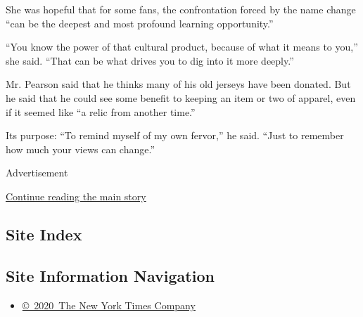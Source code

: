 She was hopeful that for some fans, the confrontation forced by the name
change ``can be the deepest and most profound learning opportunity.''

``You know the power of that cultural product, because of what it means
to you,'' she said. ``That can be what drives you to dig into it more
deeply.''

Mr. Pearson said that he thinks many of his old jerseys have been
donated. But he said that he could see some benefit to keeping an item
or two of apparel, even if it seemed like ``a relic from another time.''

Its purpose: ``To remind myself of my own fervor,'' he said. ``Just to
remember how much your views can change.''

Advertisement

\protect\hyperlink{after-bottom}{Continue reading the main story}

\hypertarget{site-index}{%
\subsection{Site Index}\label{site-index}}

\hypertarget{site-information-navigation}{%
\subsection{Site Information
Navigation}\label{site-information-navigation}}

\begin{itemize}
\tightlist
\item
  \href{https://help.nytimes3xbfgragh.onion/hc/en-us/articles/115014792127-Copyright-notice}{©~2020~The
  New York Times Company}
\end{itemize}

